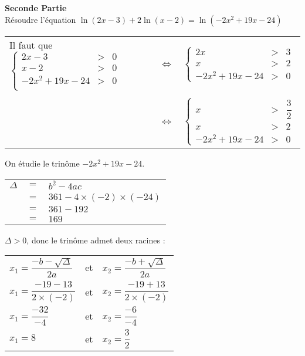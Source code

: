 \textbf{Seconde Partie} \\

Résoudre l'équation $\ln\left(2x-3\right) + 2\ln\left(x-2\right) = \ln\left(-2x^2 + 19x - 24\right)$  \\

\begin{tabular}{lll}
Il faut que $\left\{
  \begin{array}{rll}
    2x-3 & > & 0 \\
    x-2 & > & 0 \\
    -2x^2 + 19x - 24 & > & 0 \\
  \end{array}
\right.$
& 
$\Longleftrightarrow$ & 
$\left\{
  \begin{array}{rll}
    2x & > & 3 \\
    x & > & 2 \\
    -2x^2 + 19x - 24 & > & 0
  \end{array}
\right.$ \\
& & \\
& 
$\Longleftrightarrow$ & 
$\left\{
  \begin{array}{rll}
    x & > & \dfrac{3}{2} \\
    x & > & 2 \\
    -2x^2 + 19x - 24 & > & 0
  \end{array}
\right.$ \\
\end{tabular}

On étudie le trinôme $-2x^2 + 19x - 24$. \\

\begin{tabular}{lll}
$\Delta$ & $=$ & $b^2 - 4ac$ \\
& $=$ & $361 - 4 \times \left(-2\right) \times \left(-24\right)$ \\
& $=$ & $361 - 192$ \\
& $=$ & $169$ \\
\end{tabular}

\vspace*{.3cm}

$\Delta > 0$, donc le trinôme admet deux racines : \\

\begin{tabular}{lll}
$x_1 = \dfrac{-b - \sqrt{\Delta}}{2a}$ & et & $x_2 = \dfrac{-b + \sqrt{\Delta}}{2a}$ \vspace*{.3cm} \\
$x_1 = \dfrac{-19 - 13}{2\times\left(-2\right)}$ & et & $x_2 = \dfrac{-19 + 13}{2\times\left(-2\right)}$ \vspace*{.3cm} \\
$x_1 = \dfrac{-32}{-4}$ & et & $x_2 = \dfrac{-6}{-4}$ \vspace*{.3cm} \\
$x_1 = 8$ & et & $x_2 = \dfrac{3}{2}$ \\
\end{tabular}

